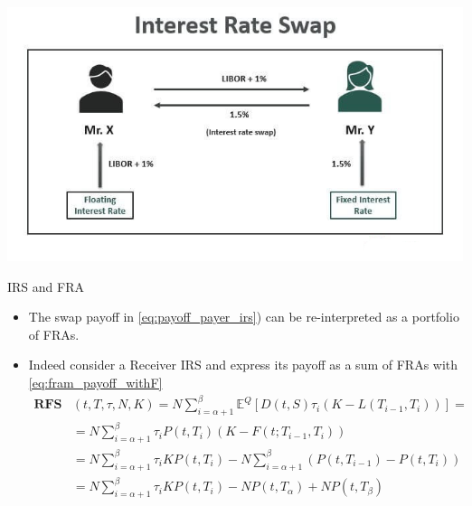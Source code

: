 \documentclass{beamer}
\begin{document}
\begin{frame}{}
\begin{center}
	\includegraphics[width=0.9\linewidth]{Interest-Rate-Swap-diagram}
\end{center}
\end{frame}

\begin{frame}{IRS and FRA}
	\begin{itemize}
		\item The swap payoff in \cref{eq:payoff_payer_irs}) can be re-interpreted as a portfolio of FRAs.
		\item Indeed consider a Receiver IRS and express its payoff as a sum of FRAs with \cref{eq:fram_payoff_withF}
		\begin{equation}
			\begin{aligned}
				\textbf{RFS}&(t,T,\tau,N,K) = 	N\sum_{i=\alpha+1}^{\beta}\mathbb{E}^Q[D(t,S)\tau_i(K - L(T_{i-1},T_i))]=\\
				&=N\sum_{i=\alpha+1}^{\beta}\tau_i P(t,T_i)(K-F(t;T_{i-1},T_i))\\
				&=N\sum_{i=\alpha+1}^{\beta}\tau_i KP(t,T_i)-N\sum_{i=\alpha+1}^{\beta}(P(t,T_{i-1})-P(t,T_i)) \\
				&=N\sum_{i=\alpha+1}^{\beta}\tau_i KP(t,T_i)-NP(t,T_\alpha)+NP(t,T_\beta)
			\end{aligned}
		\label{eq:swap_as_sum_fra}
		\end{equation}
	\end{itemize}
\end{frame}
\end{document}
